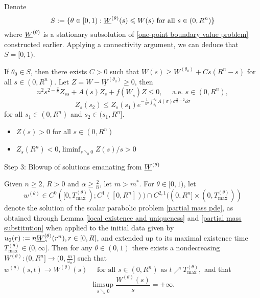 \begin{frame}
	Denote 
	\begin{equation}\nonumber
	S:=\{\theta\in[0,1): \underline{W}^{(\theta)}(s) \leqslant W(s)\text{ for all } s\in(0, R^n)\}
	\end{equation}
	where $\underline{W}^{(\theta)}$ is a stationary subsolution of \eqref{one-point boundary value problem} constructed earlier. Applying a connectivity argument, we can deduce that $S=[0,1)$.

    If $\theta_0\in S$, then there exists $C>0$ such that $W(s)\geq \underline{W}^{(\theta_0)} + Cs(R^n-s)$ for all $s\in(0,R^n)$. 
    	Let $Z = W - \underline{W}^{(\theta_0)}\geq0$, then
	\begin{equation}\nonumber
		n^2s^{2-\frac2n}Z_{ss} + A(s) Z_s + f(\underline{W}_s) Z\leqslant 0,\quad\text{ a.e. }s\in(0,R^n),
	\end{equation}
	\begin{equation}\label{ZDE}
		Z_s(s_2) \leqslant Z_s(s_1)e^{-\frac1{n^2}\int_{s_1}^{s_2}A(\sigma)\sigma^{\frac2n -2}\dd\sigma}
	\end{equation}
for all $s_1\in(0, R^n)$ and $s_2\in(s_1, R^n]$.
\begin{itemize}
  \item $Z(s) > 0$ for all $s\in (0, R^n)$
  \item $Z_s(R^n)<0$,$\liminf_{s\searrow0}Z(s)/s>0$
\end{itemize}

\end{frame}

\begin{frame}{Step 3: Blowup of solutions emanating from $\underline{W}^{(\theta)}$}
\begin{lemma}\label{subsolution blow up}
	Given $n\geqslant 2$, $R>0$ and $\alpha\geqslant\frac2n$, let $m > m^*$. For $\theta\in [0, 1)$, let 
\[
    w^{(\theta)}\in C^0([0, T_{\max}^{(\theta)}); C^1([0, R^n])) \cap C^{2,1}((0, R^n]\times(0, T_{\max}^{(\theta)}))
\]
    denote the solution of the scalar parabolic problem \eqref{partial mass pde}, as obtained through Lemma \ref{local existence and uniqueness} and \eqref{partial mass substitution} when applied to the initial data given by $u_0(r) := n\underline{W}^{(\theta)}_s(r^n), r\in [0, R]$, and extended up to its maximal existence time $T_{\max}^{(\theta)} \in (0, \infty]$.
	Then for any $\theta\in(0,1)$ there  exists a nondecreasing $W^{(\theta)} : (0, R^n]\rightarrow (0, \frac{m}{\omega_n}]$ such that
	$w^{(\theta)}(s, t) \rightarrow W^{(\theta)}(s) \quad \text { for all } s \in\left(0, R^{n}\right) \text { as } t \nearrow T_{\text {max }}^{(\theta)},$
and that
	\begin{equation}\label{W theta blows up}
		\limsup _{s \searrow 0} \frac{W^{(\theta)}(s)}{s}=+\infty.
	\end{equation}
\end{lemma}
\end{frame}



